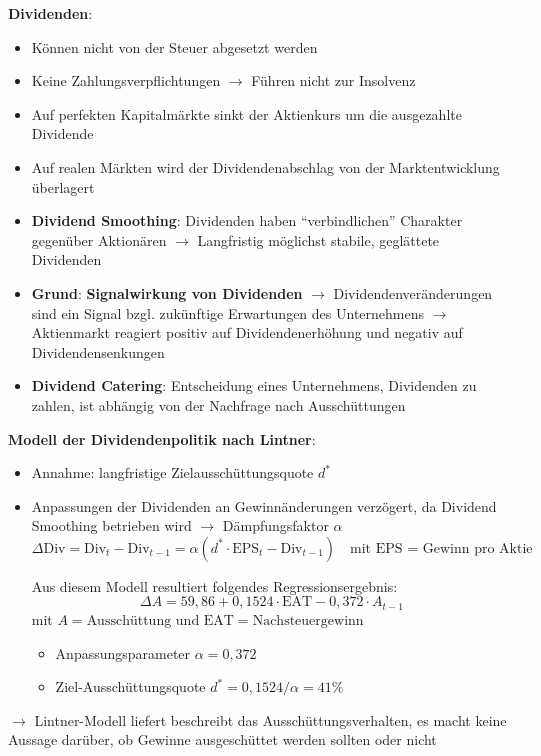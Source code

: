 \textbf{Dividenden}: 
\begin{itemize}
	\item Können nicht von der Steuer abgesetzt werden
	\item Keine Zahlungsverpflichtungen $\rightarrow$ Führen nicht zur Insolvenz
	\item Auf perfekten Kapitalmärkte sinkt der Aktienkurs um die ausgezahlte Dividende
	\item Auf realen Märkten wird der Dividendenabschlag von der Marktentwicklung überlagert
	\item \textbf{Dividend Smoothing}: Dividenden haben \enquote{verbindlichen} Charakter gegenüber Aktionären $\rightarrow$ Langfristig möglichst stabile, geglättete Dividenden
	\item \textbf{Grund}: \textbf{Signalwirkung von Dividenden} $\rightarrow$ Dividendenveränderungen sind ein Signal bzgl. zukünftige Erwartungen des Unternehmens $\rightarrow$ Aktienmarkt reagiert positiv auf Dividendenerhöhung und negativ auf Dividendensenkungen
	\item \textbf{Dividend Catering}: Entscheidung eines Unternehmens, Dividenden zu zahlen, ist abhängig von der Nachfrage nach Ausschüttungen
\end{itemize}
\bigskip
\textbf{Modell der Dividendenpolitik nach Lintner}:
\begin{itemize}
	\item Annahme: langfristige Zielausschüttungsquote $d^*$
	\item Anpassungen der Dividenden an Gewinnänderungen verzögert, da Dividend Smoothing betrieben wird $\rightarrow$ Dämpfungsfaktor $\alpha$
	$$\Delta\text{Div}=\text{Div}_t-\text{Div}_{t-1}=\alpha(d^*\cdot\text{EPS}_t-\text{Div}_{t-1})\quad\text{mit EPS = Gewinn pro Aktie}$$

	Aus diesem Modell resultiert folgendes Regressionsergebnis:
	$$\Delta A=59,86+0,1524\cdot\text{EAT}-0,372\cdot A_{t-1}$$	
	mit $A=\text{Ausschüttung und EAT}=\text{Nachsteuergewinn}$
	\begin{itemize}
		\item Anpassungsparameter $\alpha=0,372$
		\item Ziel-Ausschüttungsquote $d^*= 0,1524/\alpha = 41\%$ 
	\end{itemize}
\end{itemize}
$\rightarrow$ Lintner-Modell liefert beschreibt das Ausschüttungsverhalten, es macht keine Aussage darüber, ob Gewinne ausgeschüttet werden sollten oder nicht\\

